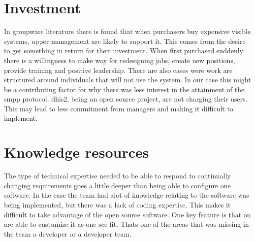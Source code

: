 \section{Investment}
In groupware literature there is found that when purchasers buy expensive visible systems, upper management are likely to support it.
This comes from the desire to get something in return for their investment.
When first purchased suddenly there is a willingness to make way for redesigning jobs, create new positions, provide training and positive leadership. 
There are also cases were work are structured around individuals that will not use the system. 
\cite{groupware:grudin}
In our case this might be a contributing factor for why there was less interest in the attainment of the \gls{smpp} protocol.
\gls{dhis2}, being an open source project, are not charging their users. 
This may lead to less commitment from managers and making it difficult to implement.


\section{Knowledge resources}
The type of technical expertise needed to be able to respond to continually changing requirements goes a little deeper than being able to configure one software. 
In the case the team had alot of knowledge relating to the software was being implemented, but there was a lack of coding expertise.
This makes it difficult to take advantage of the open source software. 
One key feature is that on are able to custumize it as one see fit. 
Thats one of the areas that was missing in the team a developer or a developer team.



